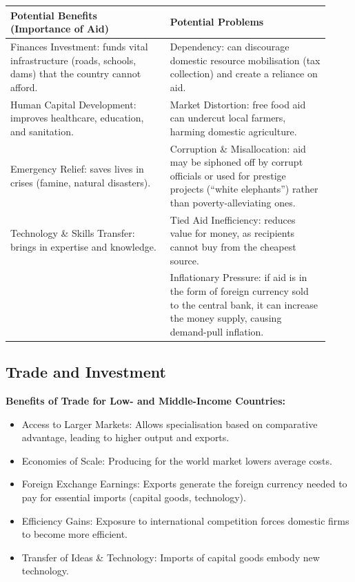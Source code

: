 \documentclass[11pt, a4paper, twoside]{book}
\begin{document}
\begin{example}
\begin{tabular}{@{}>{\RaggedRight\arraybackslash}p{0.46\linewidth}>{\RaggedRight\arraybackslash}p{0.46\linewidth}@{}}
\textbf{Potential Benefits (Importance of Aid)} & \textbf{Potential Problems} \\
\midrule
Finances Investment: funds vital infrastructure (roads, schools, dams) that the country cannot afford. & Dependency: can discourage domestic resource mobilisation (tax collection) and create a reliance on aid. \\
Human Capital Development: improves healthcare, education, and sanitation. & Market Distortion: free food aid can undercut local farmers, harming domestic agriculture. \\
Emergency Relief: saves lives in crises (famine, natural disasters). & Corruption \& Misallocation: aid may be siphoned off by corrupt officials or used for prestige projects (``white elephants'') rather than poverty-alleviating ones. \\
Technology \& Skills Transfer: brings in expertise and knowledge. & Tied Aid Inefficiency: reduces value for money, as recipients cannot buy from the cheapest source. \\
 & Inflationary Pressure: if aid is in the form of foreign currency sold to the central bank, it can increase the money supply, causing demand-pull inflation. \\
\end{tabular}
\end{example}

\subsection{Trade and Investment}

\textbf{Benefits of Trade for Low- and Middle-Income Countries:}
\begin{itemize}
  \item Access to Larger Markets: Allows specialisation based on comparative advantage, leading to higher output and exports.
  \item Economies of Scale: Producing for the world market lowers average costs.
  \item Foreign Exchange Earnings: Exports generate the foreign currency needed to pay for essential imports (capital goods, technology).
  \item Efficiency Gains: Exposure to international competition forces domestic firms to become more efficient.
  \item Transfer of Ideas \& Technology: Imports of capital goods embody new technology.
\end{itemize}
\end{document}
